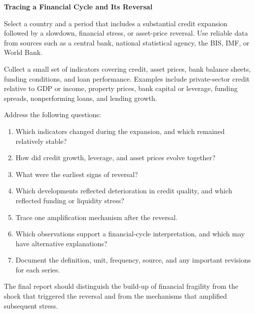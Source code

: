 
\textbf{Tracing a Financial Cycle and Its Reversal}

Select a country and a period that includes a substantial credit expansion followed by a slowdown, financial stress, or asset-price reversal. Use reliable data from sources such as a central bank, national statistical agency, the BIS, IMF, or World Bank.

Collect a small set of indicators covering credit, asset prices, bank balance sheets, funding conditions, and loan performance. Examples include private-sector credit relative to GDP or income, property prices, bank capital or leverage, funding spreads, nonperforming loans, and lending growth.

Address the following questions:

\begin{enumerate}

\item Which indicators changed during the expansion, and which remained relatively stable?

\item How did credit growth, leverage, and asset prices evolve together?

\item What were the earliest signs of reversal?

\item Which developments reflected deterioration in credit quality, and which reflected funding or liquidity stress?

\item Trace one amplification mechanism after the reversal.

\item Which observations support a financial-cycle interpretation, and which may have alternative explanations?

\item Document the definition, unit, frequency, source, and any important revisions for each series.

\end{enumerate}

The final report should distinguish the build-up of financial fragility from the shock that triggered the reversal and from the mechanisms that amplified subsequent stress.



